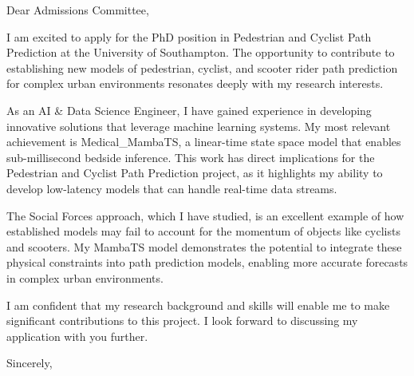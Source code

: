 \documentclass{letter}
\date{}
\begin{document}
\opening{Dear Admissions Committee,}

I am excited to apply for the PhD position in Pedestrian and Cyclist Path Prediction at the University of Southampton. The opportunity to contribute to establishing new models of pedestrian, cyclist, and scooter rider path prediction for complex urban environments resonates deeply with my research interests.

As an AI & Data Science Engineer, I have gained experience in developing innovative solutions that leverage machine learning systems. My most relevant achievement is Medical_MambaTS, a linear-time state space model that enables sub-millisecond bedside inference. This work has direct implications for the Pedestrian and Cyclist Path Prediction project, as it highlights my ability to develop low-latency models that can handle real-time data streams.

The Social Forces approach, which I have studied, is an excellent example of how established models may fail to account for the momentum of objects like cyclists and scooters. My MambaTS model demonstrates the potential to integrate these physical constraints into path prediction models, enabling more accurate forecasts in complex urban environments.

I am confident that my research background and skills will enable me to make significant contributions to this project. I look forward to discussing my application with you further.

\closing{Sincerely,}

{\signature{Ismail Aissaoui}}
\end{document}
